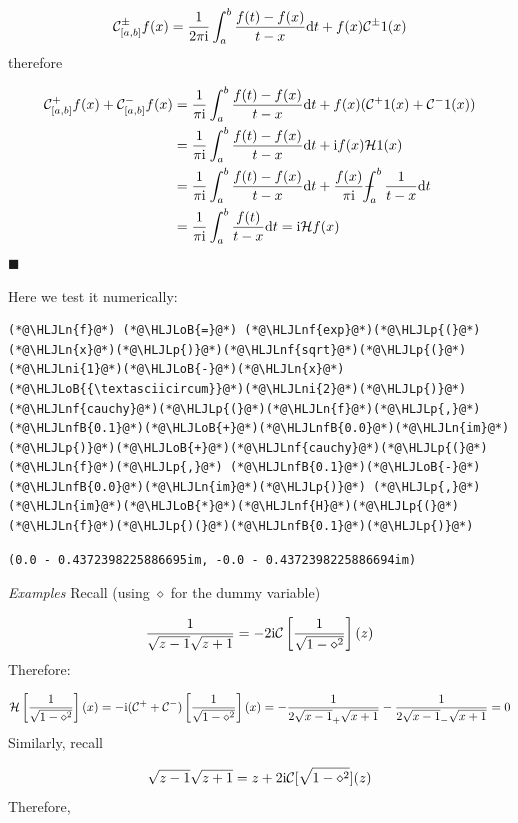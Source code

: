 \documentclass[12pt,a4paper]{article}
\newcommand{\HLJLn}[1]{#1}
\newcommand{\HLJLnf}[1]{\textcolor[RGB]{66,102,213}{#1}}
\newcommand{\HLJLnfB}[1]{\textcolor[RGB]{59,151,46}{#1}}
\newcommand{\HLJLni}[1]{\textcolor[RGB]{59,151,46}{#1}}
\newcommand{\HLJLoB}[1]{\textcolor[RGB]{102,102,102}{\textbf{#1}}}
\newcommand{\HLJLp}[1]{#1}
\def\D{ {\rm d} }
\def\I{ {\rm i} }
\def\CC{ {\cal C} }
\def\HH{ {\cal H} }
\def\Xint#1{ \mathchoice
   {\XXint\displaystyle\textstyle{#1} }%
   {\XXint\textstyle\scriptstyle{#1} }%
   {\XXint\scriptstyle\scriptscriptstyle{#1} }%
   {\XXint\scriptscriptstyle\scriptscriptstyle{#1} }%
   \!\int}
\def\XXint#1#2#3{ {\setbox0=\hbox{$#1{#2#3}{\int}$}
     \vcenter{\hbox{$#2#3$}}\kern-.5\wd0} }
\def\dashint{\Xint-}
\def\dt{\D t}
\begin{document}
\[
\CC_{[a,b]}^\pm f(x) = {1 \over 2 \pi \I} \int_a^b {f(t) - f(x) \over t-x} \dt + f(x) \CC^\pm 1(x)
\]
therefore


\begin{align*}
\CC_{[a,b]}^+ f(x) + \CC_{[a,b]}^- f(x) &= {1 \over \pi \I} \int_a^b {f(t) - f(x) \over t-x} \dt + f(x) (\CC^+ 1(x) + \CC^- 1(x) ) \\
    & = {1 \over \pi \I} \int_a^b {f(t) - f(x) \over t-x} \dt + \I  f(x) \HH 1(x)\\
    & = {1 \over \pi \I} \int_a^b {f(t) - f(x) \over t-x} \dt + {f(x)  \over \pi \I }\dashint_a^b  { 1\over t - x} \dt \\
    & = {1 \over \pi \I} \int_a^b {f(t) \over t-x} \dt =  \I \HH f(x)
\end{align*}
\ensuremath{\blacksquare}

Here we test it numerically:


\begin{lstlisting}
(*@\HLJLn{f}@*) (*@\HLJLoB{=}@*) (*@\HLJLnf{exp}@*)(*@\HLJLp{(}@*)(*@\HLJLn{x}@*)(*@\HLJLp{)}@*)(*@\HLJLnf{sqrt}@*)(*@\HLJLp{(}@*)(*@\HLJLni{1}@*)(*@\HLJLoB{-}@*)(*@\HLJLn{x}@*)(*@\HLJLoB{{\textasciicircum}}@*)(*@\HLJLni{2}@*)(*@\HLJLp{)}@*)
(*@\HLJLnf{cauchy}@*)(*@\HLJLp{(}@*)(*@\HLJLn{f}@*)(*@\HLJLp{,}@*) (*@\HLJLnfB{0.1}@*)(*@\HLJLoB{+}@*)(*@\HLJLnfB{0.0}@*)(*@\HLJLn{im}@*)(*@\HLJLp{)}@*)(*@\HLJLoB{+}@*)(*@\HLJLnf{cauchy}@*)(*@\HLJLp{(}@*)(*@\HLJLn{f}@*)(*@\HLJLp{,}@*) (*@\HLJLnfB{0.1}@*)(*@\HLJLoB{-}@*)(*@\HLJLnfB{0.0}@*)(*@\HLJLn{im}@*)(*@\HLJLp{)}@*) (*@\HLJLp{,}@*) (*@\HLJLn{im}@*)(*@\HLJLoB{*}@*)(*@\HLJLnf{H}@*)(*@\HLJLp{(}@*)(*@\HLJLn{f}@*)(*@\HLJLp{)(}@*)(*@\HLJLnfB{0.1}@*)(*@\HLJLp{)}@*)
\end{lstlisting}

\begin{lstlisting}
(0.0 - 0.4372398225886695im, -0.0 - 0.4372398225886694im)
\end{lstlisting}


\emph{Examples} Recall  (using $\diamond$ for the dummy variable)

\[
{1 \over \sqrt{z-1} \sqrt{z+1}} = -2 \I {\cal C}\left[{1 \over \sqrt{1-\diamond^2}}\right](z)
\]
Therefore:

\[
{\cal H}\left[{1 \over \sqrt{1-\diamond^2}}\right](x) = -\I (\CC^+  + \CC^-) \left[{1 \over \sqrt{1-\diamond^2}}\right](x) = -{1 \over 2  \sqrt{x-1}_+ \sqrt{x+1}} - {1 \over 2  \sqrt{x-1}_- \sqrt{x+1}} = 0
\]
Similarly, recall

\[
\sqrt{z-1}\sqrt{z+1} = z  + 2 \I {\cal C}[\sqrt{1-\diamond^2}](z)
\]
Therefore,
\end{document}

